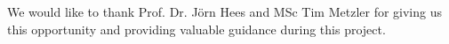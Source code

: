 

    {
        We would like to thank Prof. Dr. Jörn Hees and MSc Tim Metzler for giving us this opportunity and providing valuable guidance during this project.
    }

